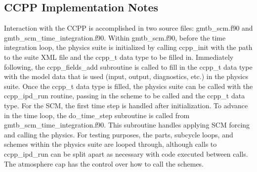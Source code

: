 \subsection*{C\+C\+PP Implementation Notes}

Interaction with the C\+C\+PP is accomplished in two source files\+: gmtb\+\_\+scm.\+f90 and gmtb\+\_\+scm\+\_\+time\+\_\+integration.\+f90. Within gmtb\+\_\+scm.\+f90, before the time integration loop, the physics suite is initialized by calling \textquotesingle{}ccpp\+\_\+init\textquotesingle{} with the path to the suite X\+ML file and the ccpp\+\_\+t data type to be filled in. Immediately following, the \textquotesingle{}ccpp\+\_\+fields\+\_\+add\textquotesingle{} subroutine is called to fill in the ccpp\+\_\+t data type with the model data that is used (input, output, diagnostics, etc.) in the physics suite. Once the ccpp\+\_\+t data type is filled, the physics suite can be called with the \textquotesingle{}ccpp\+\_\+ipd\+\_\+run\textquotesingle{} routine, passing in the scheme to be called and the ccpp\+\_\+t data type. For the S\+CM, the first time step is handled after initialization. To advance in the time loop, the \textquotesingle{}do\+\_\+time\+\_\+step\textquotesingle{} subroutine is called from gmtb\+\_\+scm\+\_\+time\+\_\+integration.\+f90. This subroutine handles applying S\+CM forcing and calling the physics. For testing purposes, the parts, subcycle loops, and schemes within the physics suite are looped through, although calls to ccpp\+\_\+ipd\+\_\+run can be split apart as necessary with code executed between calls. The \textquotesingle{}atmosphere\textquotesingle{} cap has the control over how to call the schemes. 
